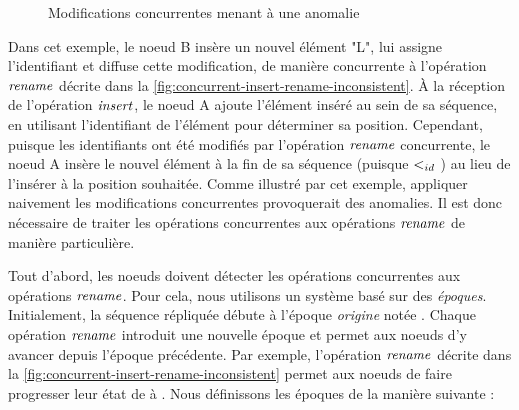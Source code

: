 \begin{figure}[!ht]
{
  }
  \caption{Modifications concurrentes menant à une anomalie}
  \label{fig:concurrent-insert-rename-inconsistent}
\end{figure}

Dans cet exemple, le noeud B insère un nouvel élément "L", lui assigne l'identifiant  et diffuse cette modification, de manière concurrente à l'opération $\mathit{rename}$ décrite dans la \autoref{fig:concurrent-insert-rename-inconsistent}.
À la réception de l'opération $\mathit{insert}$, le noeud A ajoute l'élément inséré au sein de sa séquence, en utilisant l'identifiant de l'élément pour déterminer sa position.
Cependant, puisque les identifiants ont été modifiés par l'opération $\mathit{rename}$ concurrente, le noeud A insère le nouvel élément à la fin de sa séquence (puisque  $<_{id}$ ) au lieu de l'insérer à la position souhaitée.
Comme illustré par cet exemple, appliquer naivement les modifications concurrentes provoquerait des anomalies.
Il est donc nécessaire de traiter les opérations concurrentes aux opérations $\mathit{rename}$ de manière particulière.

Tout d'abord, les noeuds doivent détecter les opérations concurrentes aux opérations $\mathit{rename}$.
Pour cela, nous utilisons un système basé sur des \emph{époques}.
Initialement, la séquence répliquée débute à l'époque \emph{origine} notée .
Chaque opération $\mathit{rename}$ introduit une nouvelle époque et permet aux noeuds d'y avancer depuis l'époque précédente.
Par exemple, l'opération $\mathit{rename}$ décrite dans la \autoref{fig:concurrent-insert-rename-inconsistent} permet aux noeuds de faire progresser leur état de  à .
Nous définissons les époques de la manière suivante :

